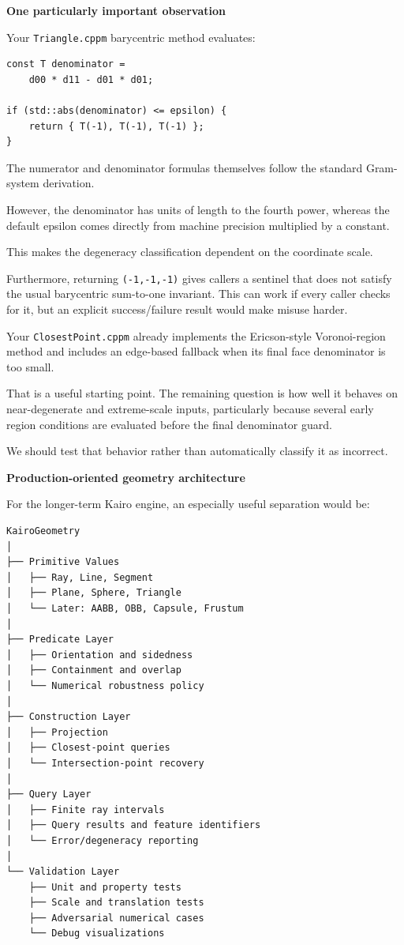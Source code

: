 \textbf{One particularly important observation}

Your \texttt{Triangle.cppm} barycentric method evaluates:

\begin{verbatim}
const T denominator =
    d00 * d11 - d01 * d01;

if (std::abs(denominator) <= epsilon) {
    return { T(-1), T(-1), T(-1) };
}
\end{verbatim}

The numerator and denominator formulas themselves follow the standard Gram-system derivation.

However, the denominator has units of length to the fourth power, whereas the default epsilon comes directly from machine precision multiplied by a constant.

This makes the degeneracy classification dependent on the coordinate scale.

Furthermore, returning \texttt{(-1,-1,-1)} gives callers a sentinel that does not satisfy the usual barycentric sum-to-one invariant. This can work if every caller checks for it, but an explicit success/failure result would make misuse harder.

Your \texttt{ClosestPoint.cppm} already implements the Ericson-style Voronoi-region method and includes an edge-based fallback when its final face denominator is too small.

That is a useful starting point. The remaining question is how well it behaves on near-degenerate and extreme-scale inputs, particularly because several early region conditions are evaluated before the final denominator guard.

We should test that behavior rather than automatically classify it as incorrect.

\textbf{Production-oriented geometry architecture}

For the longer-term Kairo engine, an especially useful separation would be:

\begin{verbatim}
KairoGeometry
│
├── Primitive Values
│   ├── Ray, Line, Segment
│   ├── Plane, Sphere, Triangle
│   └── Later: AABB, OBB, Capsule, Frustum
│
├── Predicate Layer
│   ├── Orientation and sidedness
│   ├── Containment and overlap
│   └── Numerical robustness policy
│
├── Construction Layer
│   ├── Projection
│   ├── Closest-point queries
│   └── Intersection-point recovery
│
├── Query Layer
│   ├── Finite ray intervals
│   ├── Query results and feature identifiers
│   └── Error/degeneracy reporting
│
└── Validation Layer
    ├── Unit and property tests
    ├── Scale and translation tests
    ├── Adversarial numerical cases
    └── Debug visualizations
\end{verbatim}

